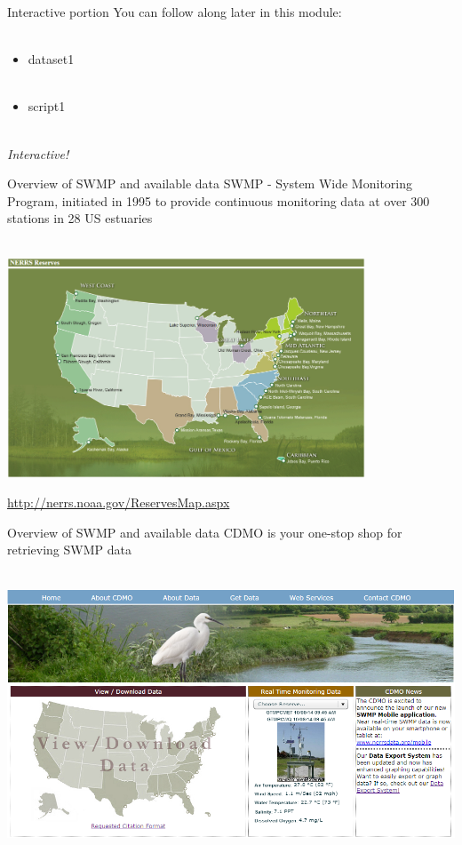 \documentclass[xcolor=svgnames]{beamer}\usepackage[]{graphicx}\usepackage[]{color}
\begin{document}
\begin{frame}{Interactive portion}
You can follow along later in this module: \\~\\
\begin{itemize}
\item dataset1\\~\\
\item script1 \\~\\
\end{itemize}
\Large
\centerline{\emph{Interactive!}}
\end{frame}

\begin{frame}{Overview of SWMP and available data}
SWMP - System Wide Monitoring Program, initiated in 1995 to provide continuous monitoring data at over 300 stations in 28 US estuaries \\~\\
\centerline{\includegraphics[width = 0.8\textwidth]{NERRS_locations.png}}
\tiny
\flushright
\href{http://nerrs.noaa.gov/ReservesMap.aspx}{http://nerrs.noaa.gov/ReservesMap.aspx}
\end{frame}

\begin{frame}[t]{Overview of SWMP and available data}
CDMO is your one-stop shop for retrieving SWMP data \\~\\
\centerline{\includegraphics[width = \textwidth]{cdmo_front.png}}
\end{frame}
\end{document}
